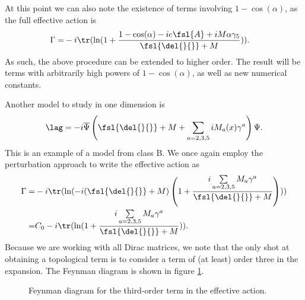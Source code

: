 At this point we can also note the existence of terms involving $1 - \cos(\alpha)$, as the full effective action is
\begin{align*}
	\Gamma =& - i\tr(\ln(1 + \frac{1 - \cos(\alpha) - ie\fsl{A} + iM\alpha\gamma_{5}}{\fsl{\del{}{}} + M})).
\end{align*}
As such, the above procedure can be extended to higher order. The result will be terms with arbitrarily high powers of $1 - \cos(\alpha)$, as well as new numerical constants.

Another model to study in one dimension is
\begin{align*}
	\lag = -i\overline{\Psi}\left(\fsl{\del{}{}} + M + \sum\limits_{a = 2, 3, 5}iM_{a}(x)\gamma^{a}\right)\Psi.
\end{align*}
This is an example of a model from class B. We once again employ the perturbation approach to write the effective action as
\begin{align*}
	\Gamma =& -i\tr(\ln(-i(\fsl{\del{}{}} + M)\left(1 + \frac{i\sum\limits_{a = 2, 3, 5}M_{a}\gamma^{a}}{\fsl{\del{}{}} + M}\right))) \\
	       =& C_{0} - i\tr(\ln(1 + \frac{i\sum\limits_{a = 2, 3, 5}M_{a}\gamma^{a}}{\fsl{\del{}{}} + M})).
\end{align*}
Because we are working with all Dirac matrices, we note that the only shot at obtaining a topological term is to consider a term of (at least) order three in the expansion. The Feynman diagram is shown in figure \ref{fig:third_order_fd}.

\begin{figure}[!ht]
	\centering
	\caption{Feynman diagram for the third-order term in the effective action.}
	\label{fig:third_order_fd}
\end{figure}


